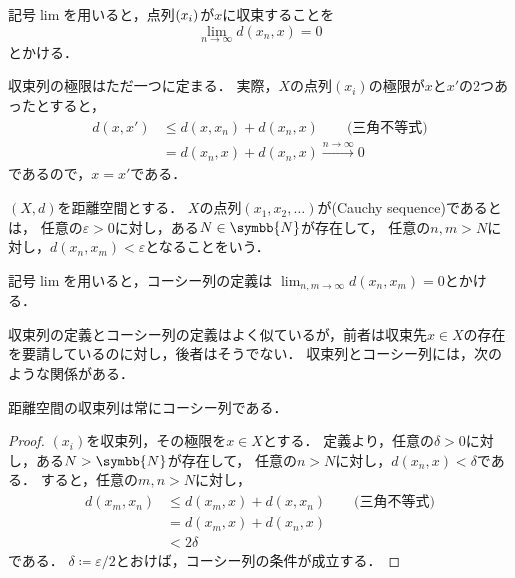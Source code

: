 \documentclass[../sotsu.tex]{subfiles}
\begin{document}
記号$\lim$を用いると，点列$\sequ{x_i}$が$x$に収束することを
\[  \lim_{n \to \infty} d(x_n, x) = 0  \]
とかける．

収束列の極限はただ一つに定まる．
実際，$X$の点列$(x_i)$の極限が$x$と$x'$の2つあったとすると，
\begin{equation*}
    \begin{split}
        d(x, x') &\leq d(x, x_n) + d(x_n, x)  \qquad \text{(三角不等式)}  \\
            &= d(x_n, x) + d(x_n, x)  
            \xrightarrow{n \to \infty} 0
    \end{split}
\end{equation*}
であるので，$x = x'$である．


\begin{definition}[コーシー列]
    \label{dfn:Cauchy-sequence}
    $(X, d)$を距離空間とする．
    $X$の点列$(x_1, x_2, \dotsc)$が(Cauchy sequence)であるとは，
    任意の$\varepsilon > 0$に対し，ある$N \in \symbb{N}$が存在して，
    任意の$n, m > N$に対し，$ d(x_n, x_m) < \varepsilon $となることをいう\cite{uchida-set-2020}．
\end{definition}

記号$\lim$を用いると，コーシー列の定義は
$\lim_{n, m \to \infty} d(x_n, x_m) = 0$とかける．

収束列の定義とコーシー列の定義はよく似ているが，前者は収束先$x \in X$の存在を要請しているのに対し，後者はそうでない．
収束列とコーシー列には，次のような関係がある．
\begin{theorem}
    \label{thm:convergent-is-Cauchy}
    距離空間の収束列は常にコーシー列である．
\end{theorem}

\begin{proof}
    $(x_i)$を収束列，その極限を$x \in X$とする．
    定義より，任意の$\delta > 0$に対し，ある$N > \symbb{N}$が存在して，
    任意の$n > N$に対し，$d(x_n, x) < \delta$である．
    すると，任意の$m, n > N$に対し，
    \begin{equation*}
        \begin{split}
            d(x_m, x_n) &\leq d(x_m, x) + d(x, x_n)  \qquad \text{(三角不等式)}  \\
                &= d(x_m, x) + d(x_n, x)  \\
                &< 2\delta
        \end{split}
    \end{equation*}
    である．
    $\delta \coloneq \varepsilon/2$とおけば，コーシー列の条件が成立する．
\end{proof}
\end{document}
